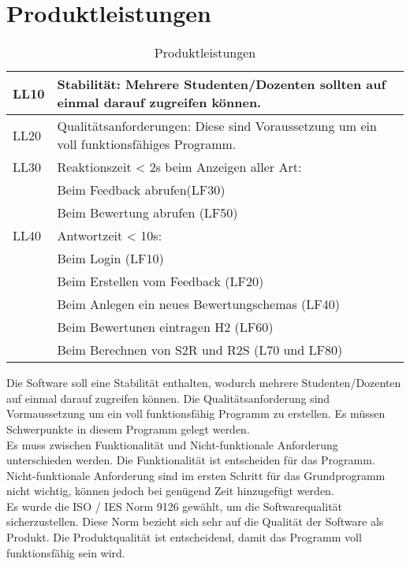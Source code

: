 


\chapter{Produktleistungen}

\begin{table}[H]
	\caption{Produktleistungen}
	\begin{tabularx}{\textwidth}{l|X}
		\midrule
		LL10              & Stabilität: Mehrere Studenten/Dozenten sollten auf einmal darauf zugreifen können. 
		\\ \hline
		LL20          & Qualitätsanforderungen: Diese sind Voraussetzung um ein voll funktionsfähiges Programm.                                         \\ \hline
		LL30    & Reaktionszeit < 2s beim Anzeigen aller Art:  \\   
		& Beim Feedback abrufen(LF30) \\
		& Beim Bewertung abrufen (LF50)  
		\\ \hline
		LL40 & Antwortzeit < 10s: \\
		& Beim Login (LF10) \\
		& Beim Erstellen vom Feedback (LF20) \\
		& Beim Anlegen ein neues Bewertungschemas (LF40) \\ 
		& Beim Bewertunen eintragen H2 (LF60) \\
		& Beim Berechnen von S2R und R2S (L70 und LF80)                                       \\
		\bottomrule
	\end{tabularx}%
\end{table}%




Die Software soll eine Stabilität enthalten, wodurch mehrere Studenten/Dozenten auf einmal darauf zugreifen können. Die Qualitätsanforderung sind Vormaussetzung um ein voll funktionsfähig Programm zu erstellen. Es müssen Schwerpunkte in diesem Programm gelegt werden.\\

Es muss zwischen Funktionalität und Nicht-funktionale Anforderung unterschieden werden. Die Funktionalität ist entscheiden für das Programm. Nicht-funktionale Anforderung sind im ersten Schritt für das Grundprogramm nicht wichtig, können jedoch bei genügend Zeit hinzugefügt werden.\\

Es wurde die ISO / IES Norm 9126 gewählt, um die Softwarequalität sicherzustellen. Diese Norm bezieht sich sehr auf die Qualität der Software als Produkt. Die Produktqualität ist entscheidend, damit das Programm voll funktionsfähig sein wird. 




